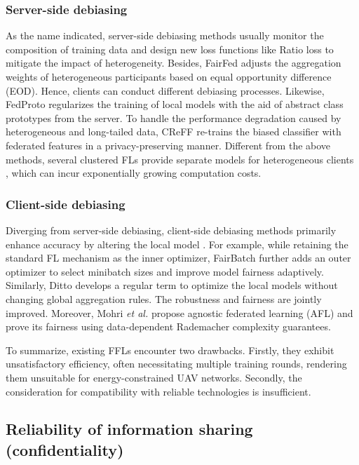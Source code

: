 \documentclass[lettersize,journal]{IEEEtran}
\begin{document}
\subsubsection{Server-side debiasing} %
As the name indicated, server-side debiasing methods usually monitor the composition of training data and design new loss functions like Ratio loss \cite{wang2021addressing} to mitigate the impact of heterogeneity. 
Besides, FairFed \cite{ezzeldin2023fairfed} adjusts the aggregation weights of heterogeneous participants based on equal opportunity difference (EOD). Hence, clients can conduct different debiasing processes. 
Likewise, FedProto \cite{tan2022fedproto} regularizes the training of local models with the aid of abstract class prototypes from the server. 
To handle the performance degradation caused by heterogeneous and long-tailed data, CReFF\cite{shang2022federated} re-trains the biased classifier with federated features in a privacy-preserving manner. 
Different from the above methods, several clustered FLs provide separate models for heterogeneous clients \cite{sattler2020clustered-CFL}, which can incur exponentially growing computation costs.
\subsubsection{Client-side debiasing} %
Diverging from server-side debiasing, client-side debiasing methods primarily enhance accuracy by altering the local model \cite{tan2022towards}. 
For example, while retaining the standard FL mechanism as the inner optimizer, FairBatch \cite{roh2020fairbatch} further adds an outer optimizer to select minibatch sizes and improve model fairness adaptively. Similarly, Ditto \cite{li2021ditto} develops a regular term to optimize the local models without changing global aggregation rules. The robustness and fairness are jointly improved. 
Moreover, Mohri \textit{et al.} \cite{mohri2019agnostic} propose agnostic federated learning (AFL) and prove its fairness using data-dependent Rademacher complexity guarantees. 


To summarize, existing FFLs encounter two drawbacks. Firstly, they exhibit unsatisfactory efficiency, often necessitating multiple training rounds, rendering them unsuitable for energy-constrained UAV networks. Secondly, the consideration for compatibility with reliable technologies is insufficient.
\subsection{Reliability of information sharing (confidentiality)}%
\end{document}
